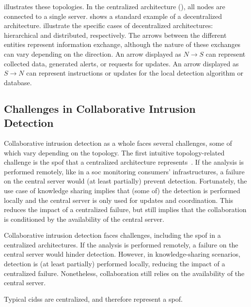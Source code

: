  illustrates these topologies.
In the centralized architecture (), all nodes are connected to a single server.
 shows a standard example of a decentralized architecture.
 illustrate the specific cases of decentralized architectures: hierarchical and distributed, respectively.
The arrows between the different entities represent information exchange, although the nature of these exchanges can vary depending on the direction.
An arrow displayed as $N \rightarrow S$ can represent collected data, generated alerts, or requests for updates.
An arrow displayed as $S \rightarrow N$ can represent instructions or updates for the local detection algorithm or database.

\subsection{Challenges in Collaborative Intrusion Detection\label{sec:bg.collab.challenges}}

Collaborative intrusion detection as a whole faces several challenges, some of which vary depending on the topology.
The first intuitive topology-related challenge is the \gls{spof} that a centralized architecture represents~\cite{}.
If the analysis is performed remotely, like in a \gls{soc} monitoring consumers' infrastructures, a failure on the central server would (at least partially) prevent detection.
Fortunately, the use case of knowledge sharing implies that (some of) the detection is performed locally and the central server is only used for updates and coordination.
This reduces the impact of a centralized failure, but still implies that the collaboration is conditioned by the availability of the central server.

Collaborative intrusion detection faces challenges, including the \gls{spof} in a centralized architectures.
If the analysis is performed remotely, a failure on the central server would hinder detection.
However, in knowledge-sharing scenarios, detection is (at least partially) performed locally, reducing the impact of a centralized failure.
Nonetheless, collaboration still relies on the availability of the central server.

\begin{challenge}
  Typical \glspl{cids} are centralized, and therefore represent a \acrfull{spof}.
  \label{chall:spof}
\end{challenge}

